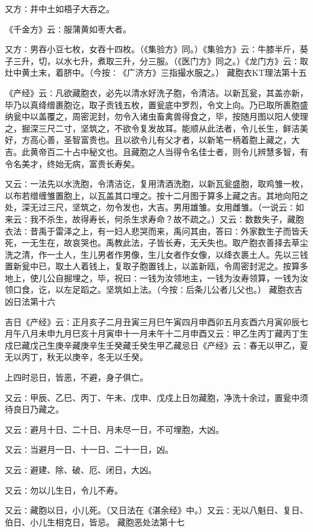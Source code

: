 \documentclass[a4paper,12pt,UTF8,twoside]{ctexbook}
\begin{document}
又方∶井中土如梧子大吞之。

《千金方》云∶服蒲黄如枣大者。

又方∶男吞小豆七枚，女吞十四枚。（《集验方》同。）《集验方》云∶牛膝半斤，葵子三升，切，以水七升，煮取三升，分三服。（《医门方》同之。）《龙门方》云∶取灶中黄土末，着脐中。（今按∶《广济方》三指撮水服之。）
藏胞衣KT理法第十五

《产经》云∶凡欲藏胞衣，必先以清水好洗子胞，令清洁。以新瓦瓮，其盖亦新，毕乃以真绛缯裹胞讫，取子贡钱五枚，置瓮底中罗烈，令文上向。乃已取所裹胞盛纳瓮中以盖覆之，周密泥封，勿令入诸虫畜禽兽得食之，毕，按随月图以阳人使理之，掘深三尺二寸，坚筑之，不欲令复发故耳。能顺从此法者，令儿长生，鲜洁美好，方高心善，圣智富贵也。且以欲令儿有父才者，以新笔一柄着胞上藏之，大吉。此黄帝百二十占中秘文也。且藏胞之人当得令名佳士者，则令儿辨慧多智，有令名美才，终始无病，富贵长寿矣。

又云∶一法先以水洗胞，令清洁讫，复用清酒洗胞，以新瓦瓮盛胞，取鸡雏一枚，以布若缯缠雏置胞上，以瓦盖其口埋之。按十二月图于算多上藏之吉。其地向阳之处，深无过三尺，坚筑之，勿令发也，大吉。男用雄雏。女用雌雏。（一说云∶如来云∶我不杀生，故得寿长，何杀生求寿命？故不疏之。）又云∶数数失子，藏胞衣法∶昔禹于雷泽之上，有一妇人悲哭而来，禹问其由，答曰∶外家数生子而皆夭死，一无生在，故哀哭也。禹教此法，子皆长寿，无夭失也。取产胞衣善择去草尘洗之清，作一土人，生儿男者作男像，生儿女者作女像，以绛衣裹土人。先以三钱置新瓮中已，取土人着钱上，复取子胞置钱上，以盖新瓯，令周密封泥之。按算多地上，使儿公自掘埋之，毕，祝曰∶一钱为汝领地主，一钱为汝寿领算，一钱为汝领口食，讫，以左足蹈之。坚筑如上法。（今按∶后条儿公者儿父也。）
藏胞衣吉凶日法第十六

吉日《产经》云∶正月亥子二月丑寅三月巳午寅四月申酉卯五月亥酉六月寅卯辰七月午八月未申九月巳亥十月寅申十一月未午十二月申酉又云∶甲乙生丙丁藏丙丁生戍巳藏戊己生庚辛藏庚辛生壬癸藏壬癸生甲乙藏忌日《产经》云∶春无以甲乙，夏无以丙丁，秋无以庚辛，冬无以壬癸。

上四时忌日，皆恶，不避，身子俱亡。

又云∶甲辰、乙巳、丙丁、午未、戊申、戊戍上日勿藏胞，净洗十余过，置瓮中须待良日乃藏之。

又云∶避月十日、二十日、月未尽一日，不可埋胞，大凶。

又云∶当避月一日、十一日、二十一日，凶。

又云∶避建、除、破、厄、闭日，大凶。

又云∶勿以儿生日，令儿不寿。

又云∶藏胞以日，小儿死。（又日法在《湛余经》中。）又云∶无以八魁日、复日、伯日、小儿生相克日，皆忌。
藏胞恶处法第十七
\end{document}
